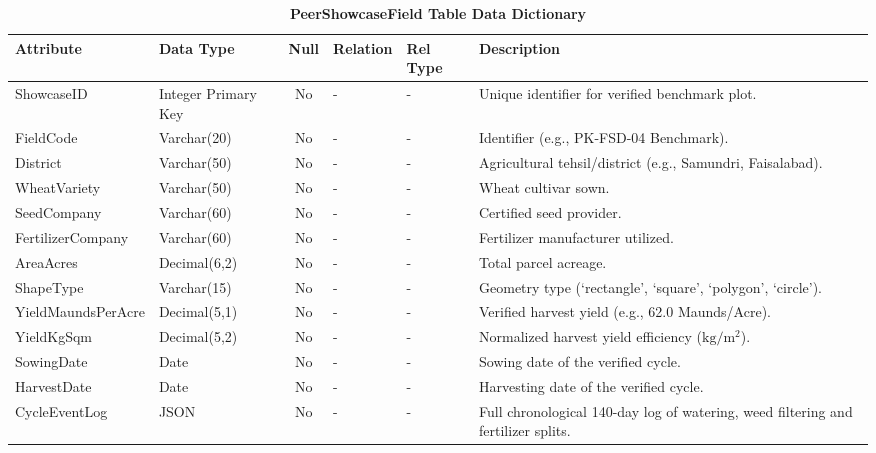 \documentclass{FastFyp}
\begin{document}
\begin{table}[!htbp]
\footnotesize
\centering
\caption{\label{tab:showcase_table} \textbf{PeerShowcaseField Table Data Dictionary}}
\begin{tabular}{|l|l|c|l|l|p{4.5cm}|}
\hline
\textbf{Attribute} & \textbf{Data Type} & \textbf{Null} & \textbf{Relation} & \textbf{Rel Type} & \textbf{Description} \\ \hline
ShowcaseID & Integer Primary Key & No & - & - & Unique identifier for verified benchmark plot. \\ \hline
FieldCode & Varchar(20) & No & - & - & Identifier (e.g., PK-FSD-04 Benchmark). \\ \hline
District & Varchar(50) & No & - & - & Agricultural tehsil/district (e.g., Samundri, Faisalabad). \\ \hline
WheatVariety & Varchar(50) & No & - & - & Wheat cultivar sown. \\ \hline
SeedCompany & Varchar(60) & No & - & - & Certified seed provider. \\ \hline
FertilizerCompany & Varchar(60) & No & - & - & Fertilizer manufacturer utilized. \\ \hline
AreaAcres & Decimal(6,2) & No & - & - & Total parcel acreage. \\ \hline
ShapeType & Varchar(15) & No & - & - & Geometry type (`rectangle', `square', `polygon', `circle'). \\ \hline
YieldMaundsPerAcre & Decimal(5,1) & No & - & - & Verified harvest yield (e.g., 62.0 Maunds/Acre). \\ \hline
YieldKgSqm & Decimal(5,2) & No & - & - & Normalized harvest yield efficiency ($\text{kg}/\text{m}^2$). \\ \hline
SowingDate & Date & No & - & - & Sowing date of the verified cycle. \\ \hline
HarvestDate & Date & No & - & - & Harvesting date of the verified cycle. \\ \hline
CycleEventLog & JSON & No & - & - & Full chronological 140-day log of watering, weed filtering and fertilizer splits. \\ \hline
\end{tabular}
\end{table}
\end{document}

